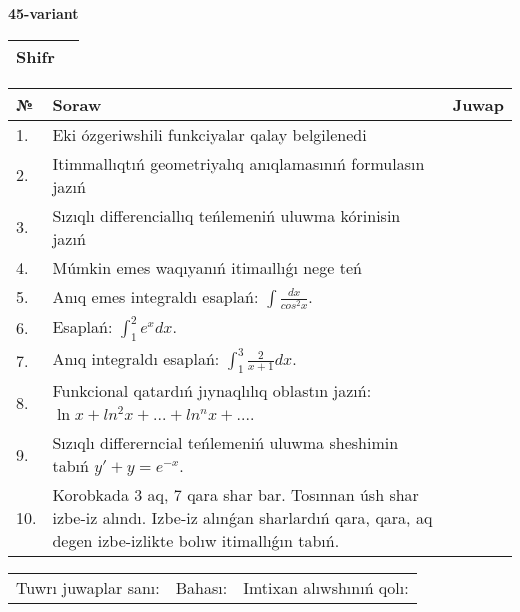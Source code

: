\documentclass{article}
\begin{document}
  \egroup
  
  \newpage
  
  
  \textbf{45-variant}\\
  
  \bgroup
  \def\arraystretch{1.6} %
  
  \begin{tabular}{|m{5.7cm}|m{9.5cm}|}
  \hline
  Shifr & \\
  \hline
  \end{tabular}
  
  \vspace{1cm}
  
  \begin{tabular}{|m{0.7cm}|m{10cm}|m{4cm}|}
  \hline
  № & Soraw & Juwap \\
  \hline
  1. & Eki ózgeriwshili funkciyalar qalay belgilenedi &  \\
  \hline
  2. & Itimmallıqtıń geometriyalıq anıqlamasınıń formulasın jazıń &  \\
  \hline
  3. & Sızıqlı differenciallıq teńlemeniń uluwma kórinisin jazıń &  \\
  \hline
  4. & Múmkin emes waqıyanıń itimaıllıǵı nege teń &  \\
  \hline
  5. & Anıq emes integraldı esaplań: \(\int\frac{dx}{cos^2 x}\). &  \\
  \hline
  6. & Esaplań: \(\int_{1}^2 {e^{x}dx}\). &  \\
  \hline
  7. & Anıq integraldı esaplań: \(\int_{1}^{3}\frac{2}{x + 1}dx\). &  \\
  \hline
  8. & Funkcional qatardıń jıynaqlılıq oblastın jazıń: \(\ln x + ln^2 x + ... + ln^{n}x + ...\). &  \\
  \hline
  9. & Sızıqlı differerncial teńlemeniń uluwma sheshimin tabıń \(y' + y = e^{- x}\). &  \\
  \hline
  10. & Korobkada 3 aq, 7 qara shar bar. Tosınnan úsh shar izbe-iz alındı. Izbe-iz alınǵan sharlardıń qara, qara, aq degen izbe-izlikte bolıw itimallıǵın tabıń. &  \\
  \hline
  \end{tabular}
  
  \vspace{1cm}
  
  \begin{tabular}{lll}
  Tuwrı juwaplar sanı: \underline{\hspace{1.5cm}} & 
  Bahası: \underline{\hspace{1.5cm}} & 
  Imtixan alıwshınıń qolı: \underline{\hspace{2cm}} \\
  \end{tabular}
  
\end{document}
